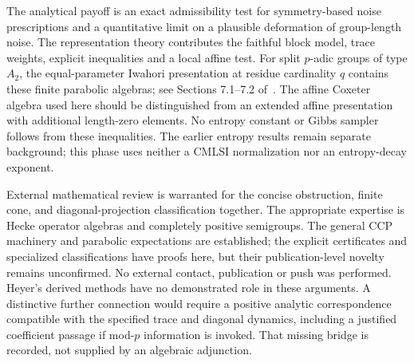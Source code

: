 The analytical payoff is an exact admissibility test for symmetry-based
noise prescriptions and a quantitative limit on a plausible deformation
of group-length noise. The representation theory contributes the faithful
block model, trace weights, explicit inequalities and a local affine test.
For split $p$-adic groups of type $A_2$, the equal-parameter Iwahori
presentation at residue cardinality $q$ contains these finite parabolic
algebras; see Sections 7.1--7.2 of~\cite{HainesKottwitzPrasad2010}.
The affine Coxeter algebra used here should be distinguished from an
extended affine presentation with additional length-zero elements.
No entropy constant or Gibbs sampler follows from these inequalities.
The earlier entropy results remain separate background; this phase uses
neither a CMLSI normalization nor an entropy-decay exponent.

External mathematical review is warranted for the concise obstruction,
finite cone, and diagonal-projection classification together. The appropriate
expertise is Hecke operator algebras and completely positive semigroups.
The general CCP machinery and parabolic expectations are established;
the explicit certificates and specialized classifications have proofs
here, but their publication-level novelty remains unconfirmed. No external
contact, publication or push was performed. Heyer's derived methods have
no demonstrated role in these arguments. A distinctive further connection
would require a positive analytic correspondence compatible with the
specified trace and diagonal dynamics, including a justified coefficient
passage if mod-$p$ information is invoked. That missing bridge is recorded,
not supplied by an algebraic adjunction.
